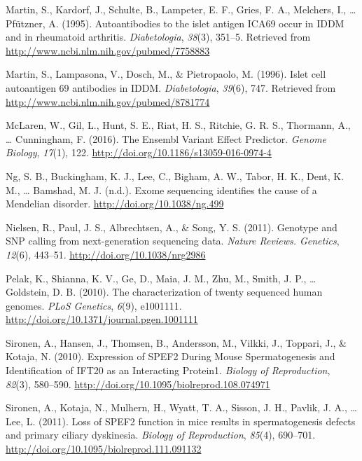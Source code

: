 \documentclass[12pt,twoside]{reedthesis}
\theoremstyle{definition}
\theoremstyle{definition}
\theoremstyle{remark}
\begin{document}
  \hypertarget{ref-Martin1995}{}
  Martin, S., Kardorf, J., Schulte, B., Lampeter, E. F., Gries, F. A.,
  Melchers, I., \ldots{} Pfützner, A. (1995). Autoantibodies to the islet
  antigen ICA69 occur in IDDM and in rheumatoid arthritis.
  \emph{Diabetologia}, \emph{38}(3), 351--5. Retrieved from
  \url{http://www.ncbi.nlm.nih.gov/pubmed/7758883}
  
  \hypertarget{ref-Martin1996}{}
  Martin, S., Lampasona, V., Dosch, M., \& Pietropaolo, M. (1996). Islet
  cell autoantigen 69 antibodies in IDDM. \emph{Diabetologia},
  \emph{39}(6), 747. Retrieved from
  \url{http://www.ncbi.nlm.nih.gov/pubmed/8781774}
  
  \hypertarget{ref-McLaren2016}{}
  McLaren, W., Gil, L., Hunt, S. E., Riat, H. S., Ritchie, G. R. S.,
  Thormann, A., \ldots{} Cunningham, F. (2016). The Ensembl Variant Effect
  Predictor. \emph{Genome Biology}, \emph{17}(1), 122.
  \url{http://doi.org/10.1186/s13059-016-0974-4}
  
  \hypertarget{ref-Ng}{}
  Ng, S. B., Buckingham, K. J., Lee, C., Bigham, A. W., Tabor, H. K.,
  Dent, K. M., \ldots{} Bamshad, M. J. (n.d.). Exome sequencing identifies
  the cause of a Mendelian disorder. \url{http://doi.org/10.1038/ng.499}
  
  \hypertarget{ref-Nielsen2011}{}
  Nielsen, R., Paul, J. S., Albrechtsen, A., \& Song, Y. S. (2011).
  Genotype and SNP calling from next-generation sequencing data.
  \emph{Nature Reviews. Genetics}, \emph{12}(6), 443--51.
  \url{http://doi.org/10.1038/nrg2986}
  
  \hypertarget{ref-Pelak2010}{}
  Pelak, K., Shianna, K. V., Ge, D., Maia, J. M., Zhu, M., Smith, J. P.,
  \ldots{} Goldstein, D. B. (2010). The characterization of twenty
  sequenced human genomes. \emph{PLoS Genetics}, \emph{6}(9), e1001111.
  \url{http://doi.org/10.1371/journal.pgen.1001111}
  
  \hypertarget{ref-Sironen2010}{}
  Sironen, A., Hansen, J., Thomsen, B., Andersson, M., Vilkki, J.,
  Toppari, J., \& Kotaja, N. (2010). Expression of SPEF2 During Mouse
  Spermatogenesis and Identification of IFT20 as an Interacting Protein1.
  \emph{Biology of Reproduction}, \emph{82}(3), 580--590.
  \url{http://doi.org/10.1095/biolreprod.108.074971}
  
  \hypertarget{ref-Sironen2011}{}
  Sironen, A., Kotaja, N., Mulhern, H., Wyatt, T. A., Sisson, J. H.,
  Pavlik, J. A., \ldots{} Lee, L. (2011). Loss of SPEF2 function in mice
  results in spermatogenesis defects and primary ciliary dyskinesia.
  \emph{Biology of Reproduction}, \emph{85}(4), 690--701.
  \url{http://doi.org/10.1095/biolreprod.111.091132}
  
\end{document}
